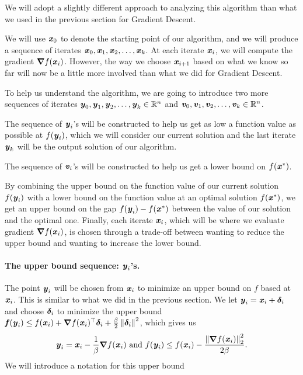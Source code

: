 
We will adopt a slightly different approach to analyzing this
algorithm than what we used in the previous section for Gradient Descent.

We will use $\boldsymbol{\mathit{x}}_0$ to denote the starting point of our algorithm, and
we will produce a sequence of iterates $\boldsymbol{\mathit{x}}_0, \boldsymbol{\mathit{x}}_1, \boldsymbol{\mathit{x}}_2, \ldots,
\boldsymbol{\mathit{x}}_k $.
At each iterate $\boldsymbol{\mathit{x}}_{i}$, we will compute the gradient $\boldsymbol{\nabla}
f(\boldsymbol{\mathit{x}}_{i})$.
However, the way we choose  $\boldsymbol{\mathit{x}}_{i+1}$ based on what we know so far
will now be a little more involved than what we did for Gradient Descent.

To help us understand the algorithm, we are going to introduce two
more sequences of iterates $\boldsymbol{\mathit{y}}_0, \boldsymbol{\mathit{y}}_1, \boldsymbol{\mathit{y}}_2, \ldots,
\boldsymbol{\mathit{y}}_k \in \mathbb{R}^n $ and $\boldsymbol{\mathit{v}}_0, \boldsymbol{\mathit{v}}_1, \boldsymbol{\mathit{v}}_2, \ldots,
\boldsymbol{\mathit{v}}_k \in \mathbb{R}^n$.

The sequence of $\boldsymbol{\mathit{y}}_i$'s will be constructed to help us get as low a
function value as possible at $f(\boldsymbol{\mathit{y}}_i)$, which we will consider our
current solution and the last iterate $\boldsymbol{\mathit{y}}_k$ will be the output solution of
our algorithm.

The sequence of $\boldsymbol{\mathit{v}}_i$'s will be constructed to help us get a lower
bound on $f(\boldsymbol{\mathit{x}}^*)$.

By combining the upper bound on the function value of our current
solution $f(\boldsymbol{\mathit{y}}_i)$ with a lower bound on the function value at an
optimal solution $f(\boldsymbol{\mathit{x}}^*)$, we get an upper bound on the gap
$f(\boldsymbol{\mathit{y}}_i)-f(\boldsymbol{\mathit{x}}^*)$
between
the value of our solution and the optimal one.
Finally, each iterate $\boldsymbol{\mathit{x}}_i$, which will be where we evaluate
gradient $\boldsymbol{\nabla} f(\boldsymbol{\mathit{x}}_{i})$, is chosen through a trade-off between
wanting to reduce the upper bound and wanting to increase the lower bound.


\paragraph{The upper bound sequence: $\boldsymbol{\mathit{y}}_i$'s.}
The point $\boldsymbol{\mathit{y}}_i$ will be chosen from $\boldsymbol{\mathit{x}}_i$ to minimize an upper
bound on $f$ based at $\boldsymbol{\mathit{x}}_i$.
This is similar to what we did in the previous section.
We let $\boldsymbol{\mathit{y}}_i = \boldsymbol{\mathit{x}}_i +\boldsymbol{\delta}_i$
and choose $\boldsymbol{\delta}_i$ to minimize the upper bound
$ \boldsymbol{\mathit{f}}(\boldsymbol{\mathit{y}}_i) \leq f(\boldsymbol{\mathit{x}}_{i})  + \boldsymbol{\nabla} f(\boldsymbol{\mathit{x}}_{i})^\top\boldsymbol{\delta}_i
     + \frac{\beta}{2} \left\| \boldsymbol{\delta}_i \right\|^2$, which gives us
\[
 \boldsymbol{\mathit{y}}_i = \boldsymbol{\mathit{x}}_{i}-\frac{1}{\beta}\boldsymbol{\nabla} f(\boldsymbol{\mathit{x}}_{i})
 \text{ and }
   f(\boldsymbol{\mathit{y}}_i) \leq f(\boldsymbol{\mathit{x}}_{i}) - \frac{\left\| \boldsymbol{\nabla}
                f(\boldsymbol{\mathit{x}}_{i}) \right\|_2^2}{2\beta}
 .
\]
We will introduce a notation for this upper bound

